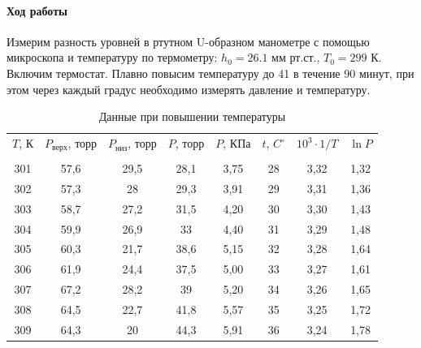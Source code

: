 \documentclass{letnab}
\begin{document}
\paragraph{Ход работы}Измерим разность уровней в ртутном U-образном манометре с помощью микроскопа и температуру по
термометру: $h_0 = 26.1$ мм рт.ст., $T_0=299$ К.
Включим термостат. Плавно повысим температуру
до 41 в течение 90 минут, при этом через каждый
градус необходимо измерять давление и температуру.\\[-0.5cm]
\begin{table}[H]
	\centering
	\caption{Данные при повышении температуры}
	\begin{tabular}{|c|c|c|c|c|c|c|c|}
		\hline
		$T$, К & $P_\text{верх}$, торр & $P_\text{низ}$, торр & $P$, торр & $P$, КПа & $t$, $C^\circ$ & $10^3\cdot1/T$ & $\ln P$ \\ \specialrule{.2em}{.1em}{.1em} 
		\multicolumn{8}{|c|}{данные при повышении температуры} \\ \hline
		301    & 57,6                     & 29,5                 & 28,1      & 3,75     & 28             & 3,32           & 1,32    \\ \hline
		302    & 57,3                     & 28                   & 29,3      & 3,91     & 29             & 3,31           & 1,36    \\ \hline
		303    & 58,7                     & 27,2                 & 31,5      & 4,20     & 30             & 3,30           & 1,43    \\ \hline
		304    & 59,9                     & 26,9                 & 33        & 4,40     & 31             & 3,29           & 1,48    \\ \hline
		305    & 60,3                     & 21,7                 & 38,6      & 5,15     & 32             & 3,28           & 1,64    \\ \hline
		306    & 61,9                     & 24,4                 & 37,5      & 5,00     & 33             & 3,27           & 1,61    \\ \hline
		307    & 67,2                     & 28,2                 & 39        & 5,20     & 34             & 3,26           & 1,65    \\ \hline
		308    & 64,5                     & 22,7                 & 41,8      & 5,57     & 35             & 3,25           & 1,72    \\ \hline
		309    & 64,3                     & 20                   & 44,3      & 5,91     & 36             & 3,24           & 1,78    \\ \hline

\end{tabular}
\end{table}
\end{document}
